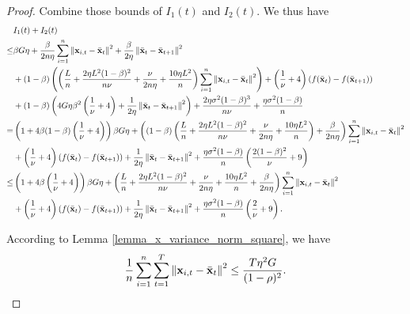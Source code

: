 \documentclass{article}
\begin{document}
\begin{proof}
Combine those bounds of $I_1(t)$ and $I_2(t)$. We thus have
\begin{align}
\nonumber
& I_1(t) + I_2(t) \\ \nonumber 
\le & \beta G \eta + \frac{\beta}{2n\eta }\sum_{i=1}^n \left\lVert{\bf x}_{i,t} - \bar{{\bf x}}_t\right\rVert^2 + \frac{\beta }{2\eta } \left\lVert\bar{{\bf x}}_t - \bar{{\bf x}}_{t+1}\right\rVert^2 \\ \nonumber
& + (1-\beta) \left(  \left(  \frac{L}{n} + \frac{2\eta L^2(1-\beta)^2}{n\nu} + \frac{\nu}{2n\eta} + \frac{10\eta L^2}{n}  \right)\sum_{i=1}^n\left\lVert{\bf x}_{i,t} - \bar{{\bf x}}_t \right\rVert^2 \right) + \left( \frac{1}{\nu} + 4 \right)\left( f(\bar{{\bf x}}_t) - f(\bar{{\bf x}}_{t+1})  \right)\\ \nonumber 
&+ (1-\beta) \left(  4G\eta\beta^2\left( \frac{1}{\nu} + 4 \right) +  \frac{1}{2\eta} \left\lVert \bar{{\bf x}}_t - \bar{{\bf x}}_{t+1}\right\rVert^2  \right) + \frac{2\eta \sigma^2 (1-\beta)^3}{n\nu}+\frac{\eta \sigma^2(1-\beta)}{n} \\ \nonumber
= & \left( 1 + 4\beta(1-\beta)\left( \frac{1}{\nu}+4 \right) \right)\beta G \eta + \left(  (1-\beta)  \left(  \frac{L}{n} + \frac{2\eta L^2(1-\beta)^2}{n\nu} + \frac{\nu}{2n\eta} + \frac{10\eta L^2}{n}  \right) + \frac{\beta}{2n\eta}  \right)\sum_{i=1}^n\left\lVert{\bf x}_{i,t} - \bar{{\bf x}}_t \right\rVert^2 \\ \nonumber 
&+ \left( \frac{1}{\nu} + 4 \right)\left( f(\bar{{\bf x}}_t) - f(\bar{{\bf x}}_{t+1}) \right) + \frac{1}{2\eta}\left\lVert \bar{{\bf x}}_t - \bar{{\bf x}}_{t+1}\right\rVert^2 + \frac{\eta \sigma^2 (1-\beta)}{n}\left( \frac{2(1-\beta)^2}{\nu}+9 \right)\\ \nonumber
\le & \left( 1 + 4\beta\left( \frac{1}{\nu}+4 \right) \right)\beta G \eta + \left(  \frac{L}{n} + \frac{2\eta L^2(1-\beta)^2}{n\nu} + \frac{\nu}{2n\eta} + \frac{10\eta L^2}{n}  + \frac{\beta}{2n\eta}  \right)\sum_{i=1}^n\left\lVert{\bf x}_{i,t} - \bar{{\bf x}}_t \right\rVert^2 \\ \nonumber 
&+ \left( \frac{1}{\nu} + 4 \right)\left( f(\bar{{\bf x}}_t) - f(\bar{{\bf x}}_{t+1}) \right) + \frac{1}{2\eta}\left\lVert \bar{{\bf x}}_t - \bar{{\bf x}}_{t+1}\right\rVert^2 + \frac{\eta \sigma^2 (1-\beta)}{n}\left( \frac{2}{\nu}+9 \right).
\end{align}






According to Lemma \ref{lemma_x_variance_norm_square}, we have
\begin{align}
\nonumber
\frac{1}{n}\sum_{i=1}^n \sum_{t=1}^T \left\lVert{\bf x}_{i,t} - \bar{{\bf x}}_t\right\rVert^2 \le \frac{T \eta^2 G}{(1-\rho)^2}.
\end{align} 


\end{proof}
\end{document}
